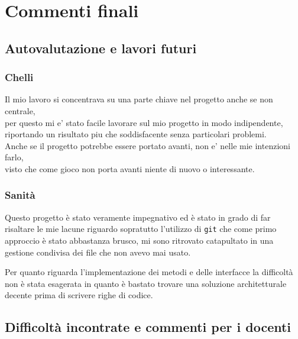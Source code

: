 \documentclass[a4paper,12pt]{report}
\begin{document}
    \chapter{Commenti finali}
    \section{Autovalutazione e lavori futuri}
    \subsection{Chelli}
    Il mio lavoro si concentrava su una parte chiave nel progetto anche se non centrale,\\
    per questo mi e' stato facile lavorare sul mio progetto in modo indipendente,\\
    riportando un risultato piu che soddisfacente senza particolari problemi.\\
    Anche se il progetto potrebbe essere portato avanti, non e' nelle mie intenzioni farlo,\\
    visto che come gioco non porta avanti niente di nuovo o interessante.\\
    \subsection{Sanità}
    \par Questo progetto è stato veramente impegnativo ed è stato in grado di far risaltare le mie lacune riguardo sopratutto l'utilizzo di \texttt{git} che come
    primo approccio è stato abbastanza brusco, mi sono ritrovato catapultato in una gestione condivisa dei file che non avevo mai usato.
    \par Per quanto riguarda l'implementazione dei metodi e delle interfacce la difficoltà non è stata esagerata in quanto è bastato trovare una soluzione
    architetturale decente prima di scrivere righe di codice.
    \section{Difficoltà incontrate e commenti per i docenti}
    \appendix
\end{document}
